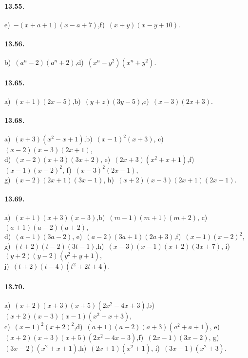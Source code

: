 \paragraph{13.55.}
e)~$-(x+a+1)(x-a+7)$,\quad f)~$(x+y)(x-y+10)$.

\paragraph{13.56.}
b)~$\left(a^{n}-2\right)\left(a^{n}+2\right)$,\quad d)~$\left(x^{n}-y^{2}\right)\left(x^{n}+y^{2}\right)$.

\paragraph{13.65.} a)~$(x+1)(2x-5)$,\quad b)~$(y+z)(3y-5)$,\quad e)~$(x-3)\left(2x+3\right)$.

\paragraph{13.68.} a)~$(x+3)\left(x^{2}-x+1\right)$,\quad b)~$(x-1)^{2}(x+3)$,\quad
c)~$(x-2)(x-3)(2x+1)$,\protect\\
d)~$(x-2)(x+3)(3x+2)$,\quad
e)~$(2x+3)\left(x^{2}+x+1\right)$,\quad f)~$(x-1)(x-2)^{2}$,\quad
f)~$(x-3)^{2}(2x-1)$,\protect\\
g)~$(x-2)(2x+1)(3x-1)$,\quad
h)~$(x+2)(x-3)(2x+1)(2x-1)$.

\paragraph{13.69.} a)~$(x+1)(x+3)\left(x-3\right)$,\quad b)~$(m-1)(m+1)\left(m+2\right)$,\quad
c)~$(a+1)(a-2)\left(a+2\right)$,\protect\\
d)~$(a+1)\left(3a-2\right)$,\quad
e)~$(a-2)(3a+1)\left(2a+3\right)$,\quad f)~$(x-1)(x-2)^{2}$,\quad
g)~$(t+2)(t-2)\left(3t-1\right)$,\quad h)~$(x-3)(x-1)(x+2)(3x+7)$,\quad
i)~$(y+2)(y-2)\left(y^{2}+y+1\right)$,\quad
\protect\\j)~$(t+2)(t-4)\left(t^{2}+2t+4\right)$.

\paragraph{13.70.} a)~$(x+2)(x+3)(x+5)\left(2x^{2}-4x+3\right)$,\quad b)~$(x+2)(x-3)(x-1)\left(x^{2}+x+3\right)$,\quad
\protect\\ c)~$(x-1)^{2}\left(x+2\right)^{2}$,\quad d)~$(a+1)(a-2)(a+3)(a^{2}+a+1)$,\quad
e)~$(x+2)(x+3)(x+5)(2x^{2}-4x-3)$,\quad f)~$(2x-1)(3x-2)$,\quad
g)~$(3x-2)\left(x^{2}+x+1\right)$,\quad h)~$(2x+1)\left(x^{2}+1\right)$,\quad
i)~$(3x-1)\left(x^{2}+3\right)$.

